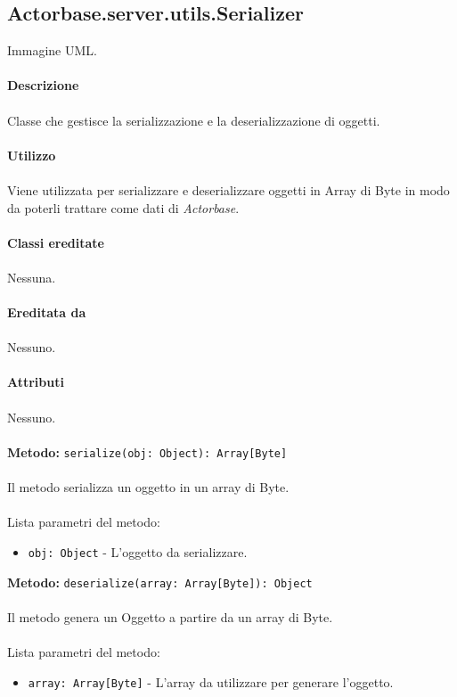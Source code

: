 \documentclass[a4paper]{article}
\begin{document}
	\subsection{Actorbase.server.utils.Serializer}
		Immagine UML.
		\\ \\
		\textbf{Descrizione}
			\\ \\
			Classe che gestisce la serializzazione e la deserializzazione di oggetti.
			\\ \\
		\textbf{Utilizzo}
			\\ \\
			Viene utilizzata per serializzare e deserializzare oggetti in Array di Byte in modo da poterli trattare come dati di \emph{Actorbase}.
			\\ \\
		\textbf{Classi ereditate}
			\\ \\
			Nessuna.
			\\ \\
		\textbf{Ereditata da}
			\\ \\
			Nessuno.
			\\ \\
		\textbf{Attributi}
			\\ \\
			Nessuno.
			\\ \\
		\textbf{Metodo: }\texttt{serialize(obj: Object): Array[Byte]}
			\\ \\
			Il metodo serializza un oggetto in un array di Byte.
			\\ \\
			Lista parametri del metodo:
			\begin{itemize}
				\item \texttt{obj: Object} - L'oggetto da serializzare.
			\end{itemize}
		\textbf{Metodo: }\texttt{deserialize(array: Array[Byte]): Object}
			\\ \\
			Il metodo genera un Oggetto a partire da un array di Byte.
			\\ \\
			Lista parametri del metodo:
			\begin{itemize}
				\item \texttt{array: Array[Byte]} - L'array da utilizzare per generare l'oggetto.
			\end{itemize}
			
\end{document}
